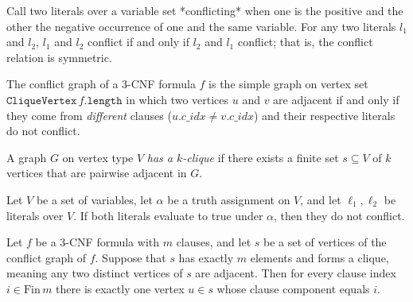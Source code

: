 \begin{theorem}
\label{ThreeSATToClique.literalsConflict_symm}
\leanok
{}
Call two literals over a variable set *conflicting* when one is the positive and the
other the negative occurrence of one and the same variable. For any two literals $l_1$
and $l_2$, $l_1$ and $l_2$ conflict if and only if $l_2$ and $l_1$ conflict; that is,
the conflict relation is symmetric.
\end{theorem}

\begin{definition}
\label{ThreeSATToClique.toCliqueGraph}
\leanok
{}
The conflict graph of a 3-CNF formula $f$ is the simple graph on vertex set
$\mathtt{CliqueVertex}\,f.\mathtt{length}$ in which two vertices $u$ and $v$ are
adjacent if and only if they come from \emph{different} clauses ($u.c\_idx \ne
v.c\_idx$) and their respective literals do not conflict.
\end{definition}

\begin{definition}
\label{ThreeSATToClique.hasClique}
\leanok
A graph $G$ on vertex type $V$ \emph{has a $k$-clique} if there exists a finite set
$s \subseteq V$ of $k$ vertices that are pairwise adjacent in $G$.
\end{definition}

\begin{lemma}
\label{ThreeSATToClique.no_conflict_of_true}
\leanok
{}
Let $V$ be a set of variables, let $\alpha$ be a truth assignment on $V$, and let
$\ell_1,\ell_2$ be literals over $V$. If both literals evaluate to true under $\alpha$,
then they do not conflict.
\end{lemma}

\begin{lemma}
\label{ThreeSATToClique.clique_vertices_choose_one_per_clause}
\leanok
{}
Let $f$ be a 3-CNF formula with $m$ clauses, and let $s$ be a set of vertices of the
conflict graph of $f$. Suppose that $s$ has exactly $m$ elements and forms a clique,
meaning any two distinct vertices of $s$ are adjacent. Then for every clause index $i
\in \mathrm{Fin}\,m$ there is exactly one vertex $u \in s$ whose clause component equals
$i$.
\end{lemma}

